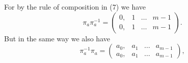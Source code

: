 
For by the rule of composition in (7) we have
\[
\pi_a \pi_a^{-1} = \begin{pmatrix} 0, & 1 & \ldots & m-1 \\ 0, & 1 & \ldots & m-1 \end{pmatrix}.
\]
But in the same way we also have
\[
\pi_a^{-1}\pi_a = \begin{pmatrix} a_0, & a_1 & \ldots & a_{m-1} \\ a_0, & a_1 & \ldots & a_{m-1} \end{pmatrix},
\]
